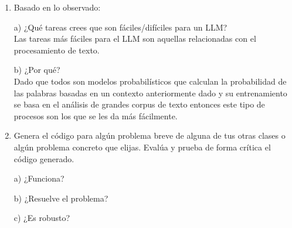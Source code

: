 \documentclass[a4paper, 11pt]{article}
\newcommand{\Pspace}{0.5cm}
\newcommand{\Aspace}{0.2cm}
\begin{document}
\begin{enumerate}
            \vspace{\Aspace} \par
            b) ¿Lo usarías para subir información confidencial?
            \\ { \color{azul} No subiría información que sea demasiado sensible. }



        \vspace{\Pspace}
        \item Basado en lo observado: \par
            \vspace{\Aspace} \par
            a) ¿Qué tareas crees que son fáciles/difíciles para un LLM?
            \\ { \color{azul} Las tareas más fáciles para el LLM son aquellas relacionadas con el procesamiento de texto. }

            \vspace{\Aspace} \par
            b) ¿Por qué?
            \\ { \color{azul} Dado que todos son modelos probabilísticos que calculan la probabilidad de las palabras basadas en un contexto anteriormente dado y su entrenamiento se basa en el análisis de grandes corpus de texto entonces este tipo de procesos son los que se les da más fácilmente. }



        \vspace{\Pspace}
        \item Genera el código para algún problema breve de alguna de tus otras clases o algún problema concreto que elijas. Evalúa y prueba de forma crítica el código generado. \par
            \vspace{\Aspace} \par
            a) ¿Funciona?
            \\ { \color{azul} }

            \vspace{\Aspace} \par
            b) ¿Resuelve el problema?
            \\ { \color{azul} }

            \vspace{\Aspace} \par
            c) ¿Es robusto?
            \\ { \color{azul} }


\end{enumerate}
\end{document}
